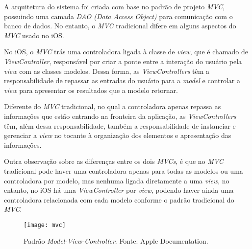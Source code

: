 A arquitetura do sistema foi criada com base no padrão de projeto \textit{MVC}, possuindo uma camada \textit{DAO (Data Access Object)} para comunicação 
com o banco de dados. No entanto, o \textit{MVC} tradicional difere em alguns aspectos do \textit{MVC} usado no iOS. 

No iOS, o \textit{MVC} trás uma controladora ligada à classe de \textit{view}, que é chamado de \textit{ViewController}, responsável por 
criar a ponte entre a interação do usuário pela \textit{view} com as classes modelos. Dessa forma, as \textit{ViewControllers} têm a 
responsabilidade de repassar as entradas do usuário para a \textit{model} e controlar a \textit{view} para apresentar os resultados que a modelo retornar.

Diferente do \textit{MVC} tradicional, no qual a controladora apenas repassa as informações que estão entrando na fronteira da aplicação, 
as \textit{ViewControllers} têm, além dessa responsabilidade, também a responsabilidade de instanciar e gerenciar a \textit{view} no tocante
à organização dos elementos e apresentação das informações.

Outra observação sobre as diferenças entre os dois \textit{MVCs}, é que no \textit{MVC} tradicional pode haver uma controladora apenas 
para todas as modelos ou uma controladora por modelo, mas nenhuma ligada diretamente a uma \textit{view}, no entanto, no iOS há uma 
\textit{ViewController} por \textit{view}, podendo haver ainda uma controladora relacionada com cada modelo conforme o padrão tradicional do \textit{MVC}.

\begin{figure}[h]
  \centering
    \texttt{[image: mvc]}
    \caption[Padrão \textit{Model-View-Controller}]{ Padrão \textit{Model-View-Controller}. Fonte: Apple Documentation.}
	\label{fig:mvc}
\end{figure}


